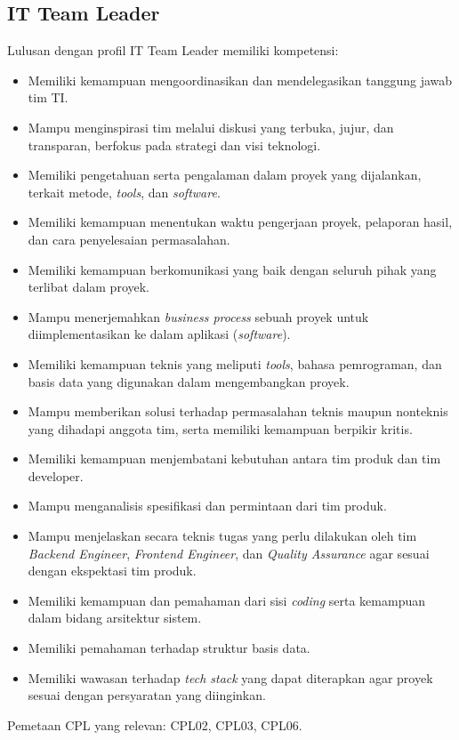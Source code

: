 \subsection{IT Team Leader}

Lulusan dengan profil IT Team Leader memiliki kompetensi:
\begin{itemize}
\item Memiliki kemampuan mengoordinasikan dan mendelegasikan tanggung jawab tim TI.
\item Mampu menginspirasi tim melalui diskusi yang terbuka, jujur, dan transparan, berfokus pada strategi dan visi teknologi.
\item Memiliki pengetahuan serta pengalaman dalam proyek yang dijalankan, terkait metode, \textit{tools}, dan \textit{software}.
\item Memiliki kemampuan menentukan waktu pengerjaan proyek, pelaporan hasil, dan cara penyelesaian permasalahan.
\item Memiliki kemampuan berkomunikasi yang baik dengan seluruh pihak yang terlibat dalam proyek.
\item Mampu menerjemahkan \textit{business process} sebuah proyek untuk diimplementasikan ke dalam aplikasi (\textit{software}).
\item Memiliki kemampuan teknis yang meliputi \textit{tools}, bahasa pemrograman, dan basis data yang digunakan dalam mengembangkan proyek.
\item Mampu memberikan solusi terhadap permasalahan teknis maupun nonteknis yang dihadapi anggota tim, serta memiliki kemampuan berpikir kritis.
\item Memiliki kemampuan menjembatani kebutuhan antara tim produk dan tim developer.
\item Mampu menganalisis spesifikasi dan permintaan dari tim produk.
\item Mampu menjelaskan secara teknis tugas yang perlu dilakukan oleh tim \textit{Backend Engineer}, \textit{Frontend Engineer}, dan \textit{Quality Assurance} agar sesuai dengan ekspektasi tim produk.
\item Memiliki kemampuan dan pemahaman dari sisi \textit{coding} serta kemampuan dalam bidang arsitektur sistem.
\item Memiliki pemahaman terhadap struktur basis data.
\item Memiliki wawasan terhadap \textit{tech stack} yang dapat diterapkan agar proyek sesuai dengan persyaratan yang diinginkan.
\end{itemize}
Pemetaan CPL yang relevan: CPL02, CPL03, CPL06.

